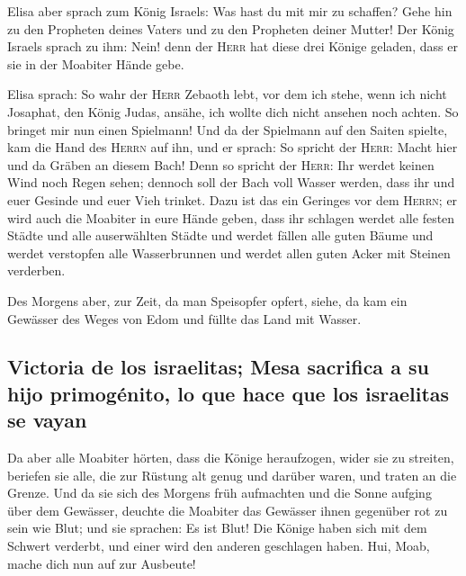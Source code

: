  Elisa aber sprach zum König Israels: Was hast du mit mir
zu schaffen? Gehe hin zu den Propheten deines Vaters und zu den
Propheten deiner Mutter! Der König Israels sprach zu ihm: Nein! denn der
\textsc{Herr} hat diese drei Könige geladen, dass er sie in der Moabiter
Hände gebe.

 Elisa sprach: So wahr der \textsc{Herr} Zebaoth lebt,
vor dem ich stehe, wenn ich nicht Josaphat, den König Judas, ansähe, ich
wollte dich nicht ansehen noch achten.  So bringet mir
nun einen Spielmann! Und da der Spielmann auf den Saiten spielte, kam
die Hand des \textsc{Herrn} auf ihn,  und er sprach: So
spricht der \textsc{Herr}: Macht hier und da Gräben an diesem Bach!
 Denn so spricht der \textsc{Herr}: Ihr werdet keinen
Wind noch Regen sehen; dennoch soll der Bach voll Wasser werden, dass
ihr und euer Gesinde und euer Vieh trinket.  Dazu ist das
ein Geringes vor dem \textsc{Herrn}; er wird auch die Moabiter in eure
Hände geben,  dass ihr schlagen werdet alle festen Städte
und alle auserwählten Städte und werdet fällen alle guten Bäume und
werdet verstopfen alle Wasserbrunnen und werdet allen guten Acker mit
Steinen verderben.

 Des Morgens aber, zur Zeit, da man Speisopfer opfert,
siehe, da kam ein Gewässer des Weges von Edom und füllte das Land mit
Wasser.

\hypertarget{victoria-de-los-israelitas-mesa-sacrifica-a-su-hijo-primoguxe9nito-lo-que-hace-que-los-israelitas-se-vayan}{%
\subsection{Victoria de los israelitas; Mesa sacrifica a su hijo
primogénito, lo que hace que los israelitas se
vayan}\label{victoria-de-los-israelitas-mesa-sacrifica-a-su-hijo-primoguxe9nito-lo-que-hace-que-los-israelitas-se-vayan}}

 Da aber alle Moabiter hörten, dass die Könige
heraufzogen, wider sie zu streiten, beriefen sie alle, die zur Rüstung
alt genug und darüber waren, und traten an die Grenze. 
Und da sie sich des Morgens früh aufmachten und die Sonne aufging über
dem Gewässer, deuchte die Moabiter das Gewässer ihnen gegenüber rot zu
sein wie Blut;  und sie sprachen: Es ist Blut! Die Könige
haben sich mit dem Schwert verderbt, und einer wird den anderen
geschlagen haben. Hui, Moab, mache dich nun auf zur Ausbeute!

